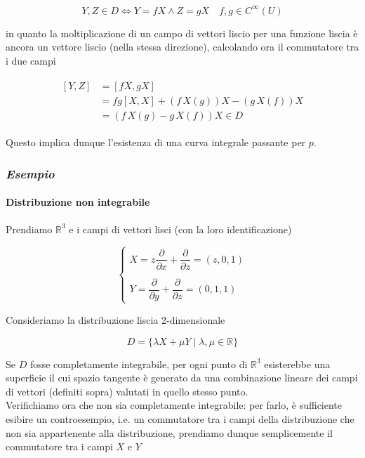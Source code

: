 \begin{equation}
	Y,Z \in D \iff Y = fX \wedge Z = gX \quad f,g \in C^{\infty}(U)
\end{equation}

in quanto la moltiplicazione di un campo di vettori liscio per una funzione liscia è ancora un vettore liscio (nella stessa direzione), calcolando ora il commutatore tra i due campi

\begin{align}
	\begin{split}
		[Y,Z] &= [fX,gX]\\
		&= fg [X,X] + (f \, X(g)) X - (g \, X(f)) X\\
		&= (f \, X(g) - g \, X(f)) X \in D
	\end{split}
\end{align}

Questo implica dunque l'esistenza di una curva integrale passante per $ p $.

\subsubsection{\textit{Esempio}}

\paragraph{Distribuzione non integrabile}

Prendiamo $ \mathbb{R}^{3} $ e i campi di vettori lisci (con la loro identificazione)

\begin{equation}
	\begin{cases}
		X = z \dfrac{\partial}{\partial x} + \dfrac{\partial}{\partial z} = (z,0,1)\\\\
		Y = \dfrac{\partial}{\partial y} + \dfrac{\partial}{\partial z} = (0,1,1)
	\end{cases}
\end{equation}

Consideriamo la distribuzione liscia 2-dimensionale

\begin{equation}
	D = \{ \lambda X + \mu Y \mid \lambda,\mu \in \mathbb{R} \}
\end{equation}

Se $ D $ fosse completamente integrabile, per ogni punto di $ \mathbb{R}^{3} $ esisterebbe una superficie il cui spazio tangente è generato da una combinazione lineare dei campi di vettori (definiti sopra) valutati in quello stesso punto.\\
Verifichiamo ora che non sia completamente integrabile: per farlo, è sufficiente esibire un controesempio, i.e. un commutatore tra i campi della distribuzione che non sia appartenente alla distribuzione, prendiamo dunque semplicemente il commutatore tra i campi $ X $ e $ Y $

